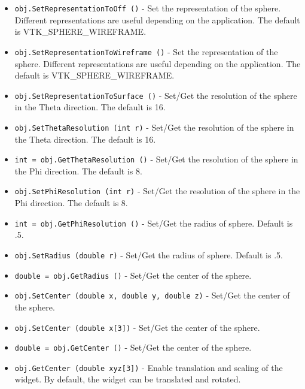 \begin{itemize}
\item  \verb|obj.SetRepresentationToOff ()| -  Set the representation of the sphere. Different representations are
 useful depending on the application. The default is 
 VTK\_SPHERE\_WIREFRAME.

\item  \verb|obj.SetRepresentationToWireframe ()| -  Set the representation of the sphere. Different representations are
 useful depending on the application. The default is 
 VTK\_SPHERE\_WIREFRAME.

\item  \verb|obj.SetRepresentationToSurface ()| -  Set/Get the resolution of the sphere in the Theta direction.
 The default is 16.

\item  \verb|obj.SetThetaResolution (int r)| -  Set/Get the resolution of the sphere in the Theta direction.
 The default is 16.

\item  \verb|int = obj.GetThetaResolution ()| -  Set/Get the resolution of the sphere in the Phi direction.
 The default is 8.

\item  \verb|obj.SetPhiResolution (int r)| -  Set/Get the resolution of the sphere in the Phi direction.
 The default is 8.

\item  \verb|int = obj.GetPhiResolution ()| -  Set/Get the radius of sphere. Default is .5.

\item  \verb|obj.SetRadius (double r)| -  Set/Get the radius of sphere. Default is .5.

\item  \verb|double = obj.GetRadius ()| -  Set/Get the center of the sphere.

\item  \verb|obj.SetCenter (double x, double y, double z)| -  Set/Get the center of the sphere.

\item  \verb|obj.SetCenter (double x[3])| -  Set/Get the center of the sphere.

\item  \verb|double = obj.GetCenter ()| -  Set/Get the center of the sphere.

\item  \verb|obj.GetCenter (double xyz[3])| -  Enable translation and scaling of the widget. By default, the widget
 can be translated and rotated.


\end{itemize}

